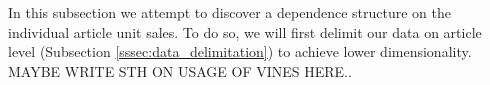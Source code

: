 In this subsection we attempt to discover a dependence structure on the individual article unit sales. To do so, we will first delimit our data on article level (Subsection \ref{sssec:data_delimitation}) to achieve lower dimensionality. \\

MAYBE WRITE STH ON USAGE OF VINES HERE..